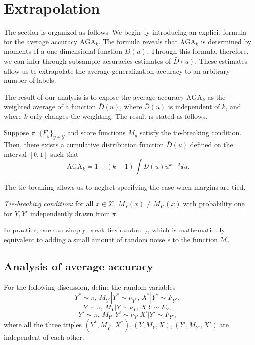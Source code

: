 \documentclass[12pt]{article}
\begin{document}
\section{Extrapolation}

The section is organized as follows.  We begin by introducing an explicit formula for the average accuracy $\text{AGA}_{k}$.  The formula reveals that $\text{AGA}_{k}$ is determined by moments of a one-dimensional function $\bar{D}(u)$.
Through this formula, therefore, we can infer through subsample accuracies 
estimates of $\bar{D}(u)$. 
These estimates allow us to extrapolate the average generalization
accuracy to an arbitrary number of labels.

The result of our analysis is to expose the average accuracy
$\text{AGA}_{k}$ as the weighted average of a function
$\bar{D}(u)$, where $\bar{D}(u)$ is independent of $k$, and where $k$
only changes the weighting.  The result is stated as follows.

\begin{theorem}\label{theorem:avrisk_identity}
Suppose $\pi$, $\{F_y\}_{y \in \mathcal{Y}}$ and score functions $M_y$ satisfy the tie-breaking condition.  Then, there exists a cumulative distribution function $\bar{D}(u)$ defined on the interval $[0,1]$ such that
\begin{equation}\label{eq:avrisk_identity}
\text{AGA}_{k} = 1 - (k-1) \int \bar{D}(u) u^{k-2} du.
\end{equation}
\end{theorem}

The tie-breaking allows us
to neglect specifying the case when
margins are tied.
\begin{definition}
\emph{Tie-breaking condition}: for all $x \in \mathcal{X}$,
$M_Y(x) \neq M_{Y'}(x)$
with probability one for $Y, Y'$ independently drawn from $\pi$.
\end{definition}
In practice, one can simply break ties randomly,
which is mathematically equivalent to adding a small amount of random
noise $\epsilon$ to the function $\mathcal{M}$.

\subsection{Analysis of average accuracy}

For the following discussion, define the random variables
\[Y^* \sim \pi,\, M_{Y^*}|Y^* \sim \nu_{Y^*},\, X^*|Y^* \sim F_{Y^*},\, \]
\[Y \sim \pi,\, M_{Y}|Y \sim \nu_{Y},\, X|Y \sim F_{Y},\, \]
\[Y' \sim \pi,\, M_{Y'}|Y' \sim \nu_{Y'}\, X'|Y' \sim F_{Y'},\, \]
where all the three triples $(Y^*, M_{Y^*}, X^*), (Y, M_{Y}, X), (Y', M_{Y'}, X')$ are independent of each other.
\end{document}
